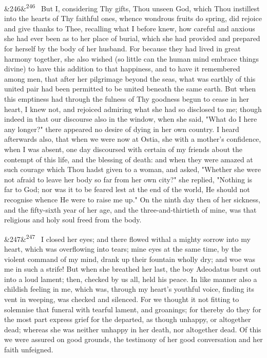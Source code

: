 \documentclass[12pt]{article}
\newcommand{\para}[1][]{\par\noindent\ifx&#1&\else\textsuperscript{\footnotesize #1}~\fi}
\begin{document}
\para[246] But I, considering Thy gifts, Thou unseen God, which Thou instillest into the hearts of Thy faithful ones, whence wondrous fruits do spring, did rejoice and give thanks to Thee, recalling what I before knew, how careful and anxious she had ever been as to her place of burial, which she had provided and prepared for herself by the body of her husband. For because they had lived in great harmony together, she also wished (so little can the human mind embrace things divine) to have this addition to that happiness, and to have it remembered among men, that after her pilgrimage beyond the seas, what was earthly of this united pair had been permitted to be united beneath the same earth. But when this emptiness had through the fulness of Thy goodness begun to cease in her heart, I knew not, and rejoiced admiring what she had so disclosed to me; though indeed in that our discourse also in the window, when she said, "What do I here any longer?" there appeared no desire of dying in her own country. I heard afterwards also, that when we were now at Ostia, she with a mother's confidence, when I was absent, one day discoursed with certain of my friends about the contempt of this life, and the blessing of death: and when they were amazed at such courage which Thou hadst given to a woman, and asked, "Whether she were not afraid to leave her body so far from her own city?" she replied, "Nothing is far to God; nor was it to be feared lest at the end of the world, He should not recognise whence He were to raise me up." On the ninth day then of her sickness, and the fifty-sixth year of her age, and the three-and-thirtieth of mine, was that religious and holy soul freed from the body.

\para[247] I closed her eyes; and there flowed withal a mighty sorrow into my heart, which was overflowing into tears; mine eyes at the same time, by the violent command of my mind, drank up their fountain wholly dry; and woe was me in such a strife! But when she breathed her last, the boy Adeodatus burst out into a loud lament; then, checked by us all, held his peace. In like manner also a childish feeling in me, which was, through my heart's youthful voice, finding its vent in weeping, was checked and silenced. For we thought it not fitting to solemnise that funeral with tearful lament, and groanings; for thereby do they for the most part express grief for the departed, as though unhappy, or altogether dead; whereas she was neither unhappy in her death, nor altogether dead. Of this we were assured on good grounds, the testimony of her good conversation and her faith unfeigned.
\end{document}
